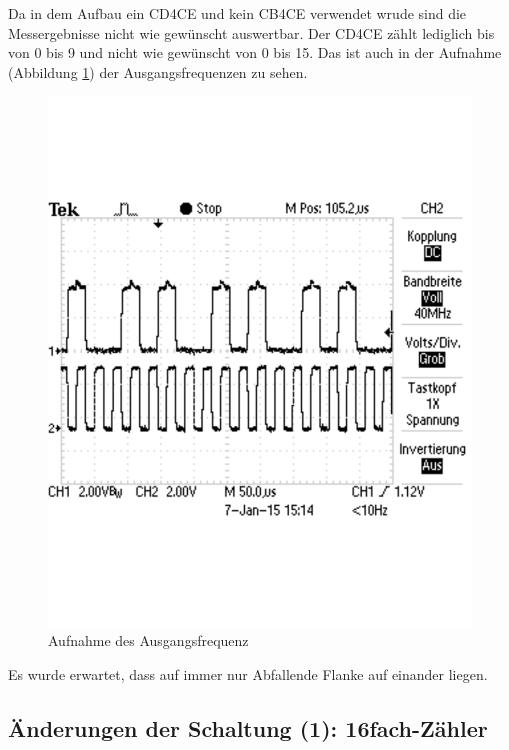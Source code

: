 \documentclass[12pt,a4paper]{article}
\begin{document}
Da in dem Aufbau ein CD4CE und kein CB4CE verwendet wrude sind die Messergebnisse nicht wie gewünscht auswertbar. Der CD4CE zählt lediglich bis von 0 bis 9 und nicht wie gewünscht von 0 bis 15. Das ist auch in der Aufnahme (Abbildung \ref{fig:frequ_1}) der Ausgangsfrequenzen zu sehen.

\begin{figure}[H] 
  \centering 	
    \includegraphics[trim = 0mm 50mm 0mm 50mm, clip, scale = 0.4]{TEK0011.pdf}
  	\caption[Aufnahme des Ausgangsfrequenz]{Aufnahme des Ausgangsfrequenz}
  \label{fig:frequ_1}
\end{figure}

Es wurde erwartet, dass auf immer nur Abfallende Flanke auf einander liegen.

\subsection{Änderungen der Schaltung (1): 16fach-Zähler}
\end{document}

